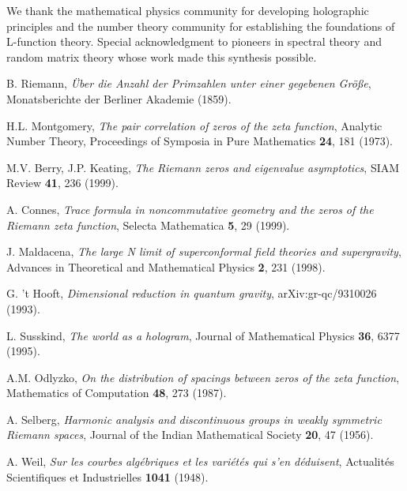 \documentclass[12pt]{article}
\begin{document}
We thank the mathematical physics community for developing holographic principles and the number theory community for establishing the foundations of L-function theory. Special acknowledgment to pioneers in spectral theory and random matrix theory whose work made this synthesis possible.

\begin{thebibliography}{99}

 B. Riemann, \emph{Über die Anzahl der Primzahlen unter einer gegebenen Größe}, Monatsberichte der Berliner Akademie (1859).

 H.L. Montgomery, \emph{The pair correlation of zeros of the zeta function}, Analytic Number Theory, Proceedings of Symposia in Pure Mathematics \textbf{24}, 181 (1973).

 M.V. Berry, J.P. Keating, \emph{The Riemann zeros and eigenvalue asymptotics}, SIAM Review \textbf{41}, 236 (1999).

 A. Connes, \emph{Trace formula in noncommutative geometry and the zeros of the Riemann zeta function}, Selecta Mathematica \textbf{5}, 29 (1999).

 J. Maldacena, \emph{The large N limit of superconformal field theories and supergravity}, Advances in Theoretical and Mathematical Physics \textbf{2}, 231 (1998).

 G. 't Hooft, \emph{Dimensional reduction in quantum gravity}, arXiv:gr-qc/9310026 (1993).

 L. Susskind, \emph{The world as a hologram}, Journal of Mathematical Physics \textbf{36}, 6377 (1995).

 A.M. Odlyzko, \emph{On the distribution of spacings between zeros of the zeta function}, Mathematics of Computation \textbf{48}, 273 (1987).

 A. Selberg, \emph{Harmonic analysis and discontinuous groups in weakly symmetric Riemann spaces}, Journal of the Indian Mathematical Society \textbf{20}, 47 (1956).

 A. Weil, \emph{Sur les courbes algébriques et les variétés qui s'en déduisent}, Actualités Scientifiques et Industrielles \textbf{1041} (1948).

\end{thebibliography}
\end{document}
